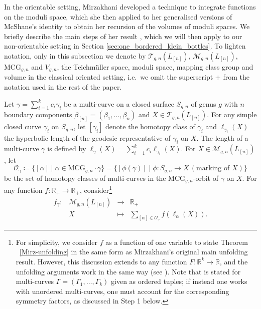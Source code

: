 \documentclass[12pt]{amsart}
\theoremstyle{plain}
\theoremstyle{definition}
\theoremstyle{remark}
\numberwithin{equation}{section}
\begin{document}
In the orientable setting, Mirzakhani \cite{Mir06} developed a technique to integrate functions on the moduli space, which she then applied to her generalised versions of McShane's identity to obtain her recursion of the volumes of moduli spaces. We briefly describe the main steps of her result \cite[Theorem 8.1]{Mir06}, which we will then apply to our non-orientable setting in Section \ref{sec:one_bordered_klein_bottles}. To lighten notation, only in this subsection we denote by $\mathcal{T}_{g,n}(L_{[n]})$, $\mathcal{M}_{g,n}(L_{[n]})$, $\mathrm{MCG}_{g,n}$ and $V_{g,n}$, the Teichm\"{u}ller space, moduli space, mapping class group and volume in the classical oriented setting, i.e.~we omit the superscript $+$ from the notation used in the rest of the paper.

Let $\gamma=\sum_{i=1}^kc_i\gamma_i$ be a multi-curve on a closed surface $S_{g,n}$ of genus $g$ with $n$ boundary components $\beta_{[n]}=(\beta_1,\ldots,\beta_n)$ and $X\in \mathcal{T}_{g,n}(L_{[n]})$. For any simple closed curve $\gamma_i$ on $S_{g,n}$, let $[\gamma_i]$ denote the homotopy class of $\gamma_i$ and $\ell_{\gamma_i}(X)$ the hyperbolic length of the geodesic representative of $\gamma_i$ on $X$. The length of a multi-curve $\gamma$ is defined by $\ell_{\gamma}(X)=\sum_{i=1}^kc_i\ell_{\gamma_i}(X)$. For $X\in\mathcal{M}_{g,n}(L_{[n]})$, let
$$
\mathcal{O}_{\gamma}\coloneqq \{[\alpha]\mid \alpha\in \mathrm{MCG}_{g,n} \cdot \gamma\}=\{[\phi(\gamma)]\mid\phi\colon S_{g,n}\rightarrow X \, (\text{marking of } X)\}
$$
be the set of homotopy classes of multi-curves in the $\mathrm{MCG}_{g,n}$-orbit of $\gamma$ on $X$. For any function $f\colon \mathbb{R}_+\rightarrow\mathbb{R}_+$, consider\footnote{For simplicity, we consider $f$ as a function of one variable to state Theorem
~\ref{Mirz-unfolding} in the same form as Mirzakhani's original main unfolding result. However, this discussion extends to any function $F\colon\mathbb{R}^k\to\mathbb{R}$, and the unfolding arguments work in the same way (see \cite[Lemma 8.4]{Mir06}). Note that \cite[Lemma 8.4]{Mir06} is stated for multi-curves $\Gamma=(\Gamma_1,\ldots,\Gamma_k)$ given as ordered tuples; if instead one works with unordered multi-curves, one must account for the corresponding symmetry factors, as discussed in Step 1 below.}
$$
\begin{array}{lrcl}
f_{\gamma}\colon & \mathcal{M}_{g,n}(L_{[n]}) &\longrightarrow  & \mathbb{R}_+\\
& X & \mapsto & \sum_{[\alpha]\in\mathcal{O}_{\gamma}}f(\ell_{\alpha}(X)).
\end{array}
$$
\end{document}
